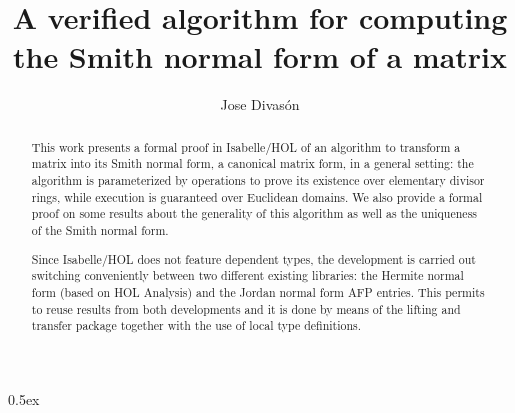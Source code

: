 \documentclass[11pt,a4paper]{article}
\begin{document}
\title{A verified algorithm for computing the Smith normal form of a matrix}
\author{Jose Divas\'on}
\maketitle

\begin{abstract}
This work presents a formal proof in Isabelle/HOL of an algorithm
to transform a matrix into its Smith normal form, a canonical
matrix form, in a general setting: the algorithm is parameterized by
operations to prove its existence over elementary divisor rings, while execution
is guaranteed over Euclidean domains. We also provide a formal proof
on some results about the generality of this algorithm as well as the
uniqueness of the Smith normal form.

Since Isabelle/HOL does not feature dependent types, the development is carried out switching conveniently between two different
existing libraries: the Hermite normal form (based on HOL Analysis) and the Jordan normal form AFP entries. This permits to reuse results from both developments and it is done by means of the lifting and transfer package together with the use of local type definitions.
\end{abstract}


\tableofcontents

\parindent 0pt\parskip 0.5ex



%
%
\end{document}
